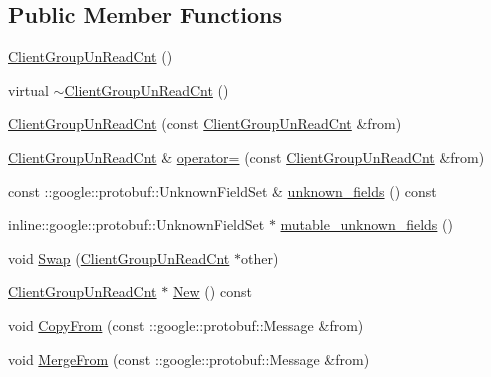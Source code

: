 \subsection*{Public Member Functions}
\begin{DoxyCompactItemize}
\item 
\hyperlink{class_i_m_1_1_base_define_1_1_client_group_un_read_cnt_a1dff7e33f185535b3d0ed2c4eb650343}{Client\+Group\+Un\+Read\+Cnt} ()
\item 
virtual \hyperlink{class_i_m_1_1_base_define_1_1_client_group_un_read_cnt_ad86f98e6ba7164f792bb71a8808115a0}{$\sim$\+Client\+Group\+Un\+Read\+Cnt} ()
\item 
\hyperlink{class_i_m_1_1_base_define_1_1_client_group_un_read_cnt_a37c1ac00249f176a615d14566eec5a8f}{Client\+Group\+Un\+Read\+Cnt} (const \hyperlink{class_i_m_1_1_base_define_1_1_client_group_un_read_cnt}{Client\+Group\+Un\+Read\+Cnt} \&from)
\item 
\hyperlink{class_i_m_1_1_base_define_1_1_client_group_un_read_cnt}{Client\+Group\+Un\+Read\+Cnt} \& \hyperlink{class_i_m_1_1_base_define_1_1_client_group_un_read_cnt_ad04ccb788ed8ee2f05b38ce64ec220c9}{operator=} (const \hyperlink{class_i_m_1_1_base_define_1_1_client_group_un_read_cnt}{Client\+Group\+Un\+Read\+Cnt} \&from)
\item 
const \+::google\+::protobuf\+::\+Unknown\+Field\+Set \& \hyperlink{class_i_m_1_1_base_define_1_1_client_group_un_read_cnt_adb96edbda073149fd46cb1af1ed18490}{unknown\+\_\+fields} () const 
\item 
inline\+::google\+::protobuf\+::\+Unknown\+Field\+Set $\ast$ \hyperlink{class_i_m_1_1_base_define_1_1_client_group_un_read_cnt_ac6a7ecd81df51eeabf49b53d4d19df82}{mutable\+\_\+unknown\+\_\+fields} ()
\item 
void \hyperlink{class_i_m_1_1_base_define_1_1_client_group_un_read_cnt_a81cf8faa11fad50c3d80cb0d400c8d6a}{Swap} (\hyperlink{class_i_m_1_1_base_define_1_1_client_group_un_read_cnt}{Client\+Group\+Un\+Read\+Cnt} $\ast$other)
\item 
\hyperlink{class_i_m_1_1_base_define_1_1_client_group_un_read_cnt}{Client\+Group\+Un\+Read\+Cnt} $\ast$ \hyperlink{class_i_m_1_1_base_define_1_1_client_group_un_read_cnt_a4dbed2078c447179ad564dc8f29e35dd}{New} () const 
\item 
void \hyperlink{class_i_m_1_1_base_define_1_1_client_group_un_read_cnt_ad12be2195956c4a1c9ed399bee332748}{Copy\+From} (const \+::google\+::protobuf\+::\+Message \&from)
\item 
void \hyperlink{class_i_m_1_1_base_define_1_1_client_group_un_read_cnt_a1e48bb011fa58d02de75b8d5dd0bec5f}{Merge\+From} (const \+::google\+::protobuf\+::\+Message \&from)

\end{DoxyCompactItemize}
